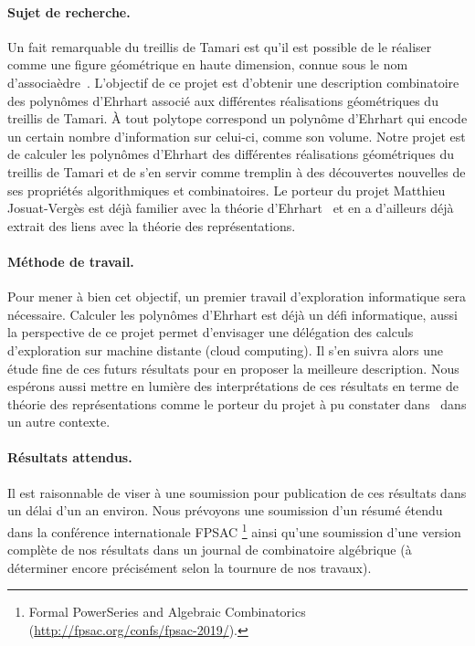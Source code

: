 \documentclass[a4paper, 10pt]{article}
\numberwithin{equation}{subsection}
\begin{document}
\paragraph{Sujet de recherche.}
Un fait remarquable du treillis de Tamari est qu'il est possible de le
réaliser comme une figure géométrique en haute dimension, connue sous le
nom d'associaèdre~\cite{Lod04}. L'objectif de ce projet est d'obtenir
une description combinatoire des polynômes d'Ehrhart associé aux
différentes réalisations géométriques du treillis de Tamari. À tout
polytope correspond un polynôme d'Ehrhart qui encode un certain nombre
d'information sur celui-ci, comme son volume. Notre projet est de
calculer les polynômes d'Ehrhart des différentes réalisations
géométriques du treillis de Tamari et de s'en servir comme tremplin à
des découvertes nouvelles de ses propriétés algorithmiques et
combinatoires. Le porteur du projet Matthieu Josuat-Vergès est déjà
familier avec la théorie d'Ehrhart~\cite{HJV16} et en a d'ailleurs déjà
extrait des liens avec la théorie des représentations.
\smallbreak

\vspace{-.25cm}

\paragraph{Méthode de travail.}
Pour mener à bien cet objectif, un premier travail d'exploration
informatique sera nécessaire. Calculer les polynômes d'Ehrhart est déjà
un défi informatique, aussi la perspective de ce projet permet
d'envisager une délégation des calculs d'exploration sur machine
distante (cloud computing). Il s'en suivra alors une étude fine de ces
futurs résultats pour en proposer la meilleure description. Nous
espérons aussi mettre en lumière des interprétations de ces résultats en
terme de théorie des représentations comme le porteur du projet à pu
constater dans~\cite{HJV16} dans un autre contexte.
\smallbreak

\vspace{-.25cm}

\paragraph{Résultats attendus.}
Il est raisonnable de viser à une soumission pour publication de ces
résultats dans un délai d'un an environ. Nous prévoyons une soumission
d'un résumé étendu dans la conférence internationale FPSAC%
\footnote{Formal PowerSeries and Algebraic Combinatorics
(\url{http://fpsac.org/confs/fpsac-2019/}).}
ainsi qu'une soumission d'une version complète de nos résultats dans un
journal de combinatoire algébrique (à déterminer encore précisément
selon la tournure de nos travaux).
\smallbreak
\end{document}
